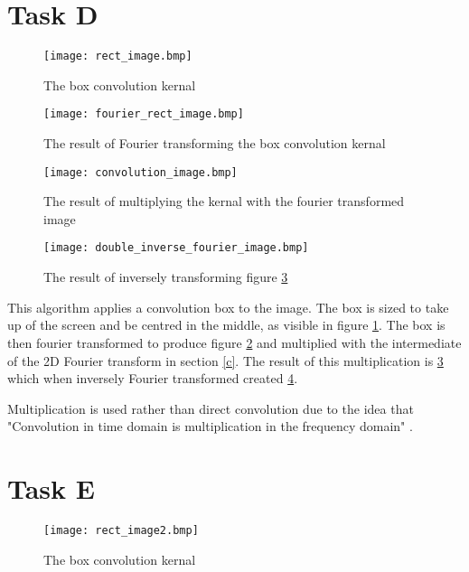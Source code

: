 \documentclass{article}
\begin{document}
\section{Task D} \label{d}

\begin{figure}[h]
    \centering
    \caption{The box convolution kernal}
    \label{fig:box}
    \texttt{[image: rect\_image.bmp]}
\end{figure}

\begin{figure}[h]
    \centering
    \caption{The result of Fourier transforming the box convolution kernal}
    \label{fig:fourierBox}
    \texttt{[image: fourier\_rect\_image.bmp]}
\end{figure}

\begin{figure}[h]
    \centering
    \caption{The result of multiplying the kernal with the fourier transformed image}
    \label{fig:boxMultiply}
    \texttt{[image: convolution\_image.bmp]}
\end{figure}

\begin{figure}[h]
    \centering
    \caption{The result of inversely transforming figure \ref{fig:boxMultiply}}
    \label{fig:fourierMultiply}
    \texttt{[image: double\_inverse\_fourier\_image.bmp]}
\end{figure}

This algorithm applies a convolution box to the image. The box is sized to take up  of the screen and be centred in the middle, as visible in figure \ref{fig:box}. The box is then fourier transformed to produce figure \ref{fig:fourierBox} and multiplied with the intermediate of the 2D Fourier transform in section \ref{c}. The result of this multiplication is \ref{fig:boxMultiply} which when inversely Fourier transformed created \ref{fig:fourierMultiply}.

Multiplication is used rather than direct convolution due to the idea that "Convolution in time domain is multiplication in the frequency domain" \parencite{ian1}.

\section{Task E} \label{e}


\begin{figure}[h]
    \centering
    \caption{The box convolution kernal}
    \label{fig:box2}
    \texttt{[image: rect\_image2.bmp]}
\end{figure}
\end{document}
